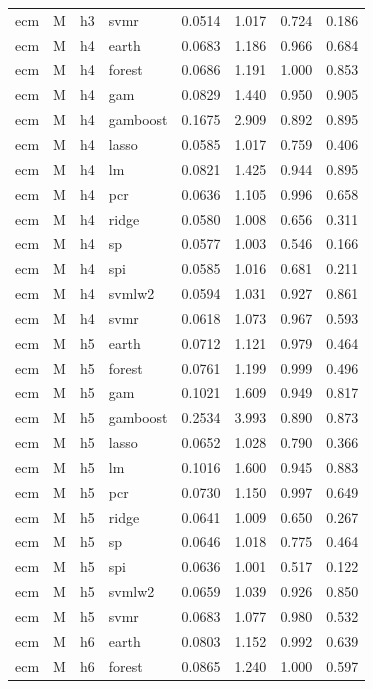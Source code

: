\begin{ThreePartTable}
\begin{longtable}[t]{llclcccc}
ecm & M & h3 & svmr & 0.0514 & 1.017 & 0.724 & 0.186\\
\addlinespace
ecm & M & h4 & earth & 0.0683 & 1.186 & 0.966 & 0.684\\
ecm & M & h4 & forest & 0.0686 & 1.191 & 1.000 & 0.853\\
ecm & M & h4 & gam & 0.0829 & 1.440 & 0.950 & 0.905\\
ecm & M & h4 & gamboost & 0.1675 & 2.909 & 0.892 & 0.895\\
ecm & M & h4 & lasso & 0.0585 & 1.017 & 0.759 & 0.406\\
ecm & M & h4 & lm & 0.0821 & 1.425 & 0.944 & 0.895\\
ecm & M & h4 & pcr & 0.0636 & 1.105 & 0.996 & 0.658\\
ecm & M & h4 & ridge & 0.0580 & 1.008 & 0.656 & 0.311\\
ecm & M & h4 & sp & 0.0577 & 1.003 & 0.546 & 0.166\\
ecm & M & h4 & spi & 0.0585 & 1.016 & 0.681 & 0.211\\
ecm & M & h4 & svmlw2 & 0.0594 & 1.031 & 0.927 & 0.861\\
ecm & M & h4 & svmr & 0.0618 & 1.073 & 0.967 & 0.593\\
\addlinespace
ecm & M & h5 & earth & 0.0712 & 1.121 & 0.979 & 0.464\\
ecm & M & h5 & forest & 0.0761 & 1.199 & 0.999 & 0.496\\
ecm & M & h5 & gam & 0.1021 & 1.609 & 0.949 & 0.817\\
ecm & M & h5 & gamboost & 0.2534 & 3.993 & 0.890 & 0.873\\
ecm & M & h5 & lasso & 0.0652 & 1.028 & 0.790 & 0.366\\
ecm & M & h5 & lm & 0.1016 & 1.600 & 0.945 & 0.883\\
ecm & M & h5 & pcr & 0.0730 & 1.150 & 0.997 & 0.649\\
ecm & M & h5 & ridge & 0.0641 & 1.009 & 0.650 & 0.267\\
ecm & M & h5 & sp & 0.0646 & 1.018 & 0.775 & 0.464\\
ecm & M & h5 & spi & 0.0636 & 1.001 & 0.517 & 0.122\\
ecm & M & h5 & svmlw2 & 0.0659 & 1.039 & 0.926 & 0.850\\
ecm & M & h5 & svmr & 0.0683 & 1.077 & 0.980 & 0.532\\
\addlinespace
ecm & M & h6 & earth & 0.0803 & 1.152 & 0.992 & 0.639\\
ecm & M & h6 & forest & 0.0865 & 1.240 & 1.000 & 0.597\\

\end{longtable}
\end{ThreePartTable}
